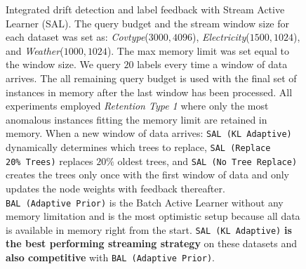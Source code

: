 \documentclass{article} %
\begin{document}
\begin{figure}
	\caption{Integrated drift detection and label feedback with Stream Active Learner (SAL). The query budget and the stream window size for each dataset was set as: \textit{Covtype}($3000, 4096$), \textit{Electricity}($1500, 1024$), and \textit{Weather}($1000, 1024$). The max memory limit was set equal to the window size. We query $20$ labels every time a window of data arrives. The all remaining query budget is used with the final set of instances in memory after the last window has been processed. All experiments employed \textit{Retention Type 1} where only the most anomalous instances fitting the memory limit are retained in memory. When a new window of data arrives: \texttt{SAL~(KL~Adaptive)} dynamically determines which trees to replace, \texttt{SAL~(Replace 20\%~Trees)} replaces $20\%$ oldest trees, and \texttt{SAL~(No~Tree~Replace)} creates the trees only once with the first window of data and only updates the node weights with feedback thereafter. \texttt{BAL~(Adaptive~Prior)} is the Batch Active Learner without any memory limitation and is the most optimistic setup because all data is available in memory right from the start. \texttt{SAL~(KL~Adaptive)} \textbf{is the best performing streaming strategy} on these datasets and \textbf{also competitive} with \texttt{BAL~(Adaptive~Prior)}.} \label{fig:concept_drift_num}
\end{figure}

\end{document}
